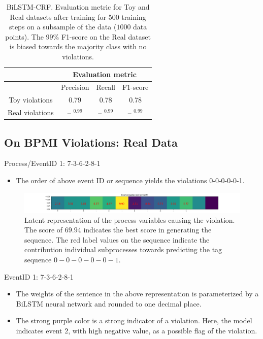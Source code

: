\documentclass{beamer}
\begin{document}
\begin{frame}
\begin{table}[!h]
\begin{tabular}{cccc}
\hline
                & \multicolumn{3}{c}{Evaluation metric} \\ \hline
                & Precision    & Recall    & F1-score   \\ \hline
Toy violations  & 0.79         & 0.78      & 0.78       \\ \hline
\rowcolor[HTML]{C0C0C0} Real violations & -- {\color{red}$^{0.99}$} & -- {\color{red}$^{0.99}$} & -- {\color{red}$^{0.99}$}              \\ \hline
\end{tabular}
\caption{\scriptsize BiLSTM-CRF. Evaluation metric for Toy and Real datasets after training for 500 training steps on a subsample of the data ($1000$ data points). The $99\%$ F1-score on the Real dataset is biased towards the majority class with no violations.}
\end{table}
\end{frame}


\subsection{On BPMI Violations: Real Data}
\begin{frame} %
\begin{block}{Process/EventID 1: 7-3-6-2-8-1}
		\begin{itemize}
                \scriptsize
				\item The order of above event ID or sequence yields the violations 0-0-0-0-0-1.
			\end{itemize}
\end{block}
\begin{figure}[!h]
            \includegraphics[scale = .23]{n_item_one.png}
            \centering
            \caption{\scriptsize Latent representation of the process variables causing the violation. The score of $69.94$ indicates the best score in generating the sequence. The red label values on the sequence indicate the contribution individual subprocesses towards predicting the tag sequence $0-0-0-0-0-1$.}
            \label{fig1}
\end{figure}
\begin{block}{EventID 1: 7-3-6-2-8-1}
		\begin{itemize}
            \scriptsize
			\item The weights of the sentence in the above representation is parameterized by a BiLSTM neural network and rounded to one decimal place.
            \item The strong purple color is a strong indicator of a violation. Here, the model indicates event $2$, with high negative value, as a possible flag of the violation.
			\end{itemize}
\end{block}
\end{frame}
\end{document}

